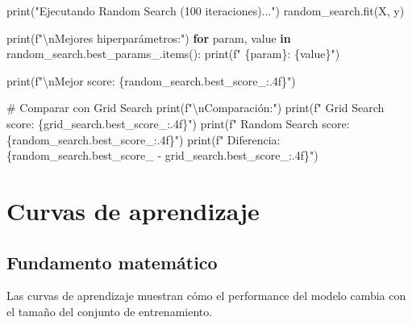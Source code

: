\documentclass[
  doc,
  floatsintext,
  longtable,
  a4paper,
  nolmodern,
  notxfonts,
  notimes,
  12pt,
  colorlinks=true,linkcolor=blue,citecolor=blue,urlcolor=blue]{apa7}
\newenvironment{Shaded}{\begin{snugshade}}{\end{snugshade}}
\newcommand{\BuiltInTok}[1]{\textcolor[rgb]{0.00,0.23,0.31}{#1}}
\newcommand{\CharTok}[1]{\textcolor[rgb]{0.13,0.47,0.30}{#1}}
\newcommand{\CommentTok}[1]{\textcolor[rgb]{0.37,0.37,0.37}{#1}}
\newcommand{\ControlFlowTok}[1]{\textcolor[rgb]{0.00,0.23,0.31}{\textbf{#1}}}
\newcommand{\KeywordTok}[1]{\textcolor[rgb]{0.00,0.23,0.31}{\textbf{#1}}}
\newcommand{\NormalTok}[1]{\textcolor[rgb]{0.00,0.23,0.31}{#1}}
\newcommand{\OperatorTok}[1]{\textcolor[rgb]{0.37,0.37,0.37}{#1}}
\newcommand{\SpecialCharTok}[1]{\textcolor[rgb]{0.37,0.37,0.37}{#1}}
\newcommand{\SpecialStringTok}[1]{\textcolor[rgb]{0.13,0.47,0.30}{#1}}
\newcommand{\StringTok}[1]{\textcolor[rgb]{0.13,0.47,0.30}{#1}}
\begin{document}
\begin{Shaded}
\begin{Highlighting}[]
\BuiltInTok{print}\NormalTok{(}\StringTok{"Ejecutando Random Search (100 iteraciones)..."}\NormalTok{)}
\NormalTok{random\_search.fit(X, y)}

\BuiltInTok{print}\NormalTok{(}\SpecialStringTok{f"}\CharTok{\textbackslash{}n}\SpecialStringTok{Mejores hiperparámetros:"}\NormalTok{)}
\ControlFlowTok{for}\NormalTok{ param, value }\KeywordTok{in}\NormalTok{ random\_search.best\_params\_.items():}
    \BuiltInTok{print}\NormalTok{(}\SpecialStringTok{f"  }\SpecialCharTok{\{}\NormalTok{param}\SpecialCharTok{\}}\SpecialStringTok{: }\SpecialCharTok{\{}\NormalTok{value}\SpecialCharTok{\}}\SpecialStringTok{"}\NormalTok{)}

\BuiltInTok{print}\NormalTok{(}\SpecialStringTok{f"}\CharTok{\textbackslash{}n}\SpecialStringTok{Mejor score: }\SpecialCharTok{\{}\NormalTok{random\_search}\SpecialCharTok{.}\NormalTok{best\_score\_}\SpecialCharTok{:.4f\}}\SpecialStringTok{"}\NormalTok{)}

\CommentTok{\# Comparar con Grid Search}
\BuiltInTok{print}\NormalTok{(}\SpecialStringTok{f"}\CharTok{\textbackslash{}n}\SpecialStringTok{Comparación:"}\NormalTok{)}
\BuiltInTok{print}\NormalTok{(}\SpecialStringTok{f"  Grid Search score:   }\SpecialCharTok{\{}\NormalTok{grid\_search}\SpecialCharTok{.}\NormalTok{best\_score\_}\SpecialCharTok{:.4f\}}\SpecialStringTok{"}\NormalTok{)}
\BuiltInTok{print}\NormalTok{(}\SpecialStringTok{f"  Random Search score: }\SpecialCharTok{\{}\NormalTok{random\_search}\SpecialCharTok{.}\NormalTok{best\_score\_}\SpecialCharTok{:.4f\}}\SpecialStringTok{"}\NormalTok{)}
\BuiltInTok{print}\NormalTok{(}\SpecialStringTok{f"  Diferencia:          }\SpecialCharTok{\{}\NormalTok{random\_search}\SpecialCharTok{.}\NormalTok{best\_score\_ }\OperatorTok{{-}}\NormalTok{ grid\_search}\SpecialCharTok{.}\NormalTok{best\_score\_}\SpecialCharTok{:.4f\}}\SpecialStringTok{"}\NormalTok{)}
\end{Highlighting}
\end{Shaded}

\section{Curvas de aprendizaje}\label{curvas-de-aprendizaje}

\subsection{Fundamento matemático}\label{fundamento-matemuxe1tico-2}

Las curvas de aprendizaje muestran cómo el performance del modelo cambia
con el tamaño del conjunto de entrenamiento.
\end{document}
